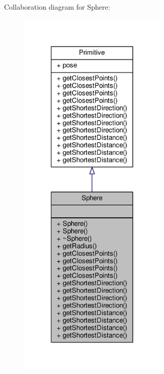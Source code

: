 Collaboration diagram for Sphere\+:
\nopagebreak
\begin{figure}[H]
\begin{center}
\leavevmode
\includegraphics[width=201pt]{class_sphere__coll__graph}
\end{center}
\end{figure}
